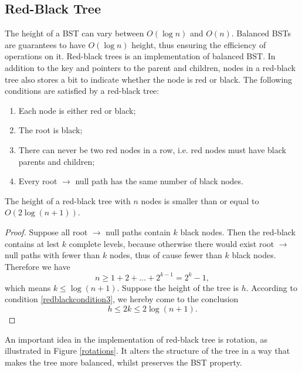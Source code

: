 \subsection{Red-Black Tree}
The height of a BST can vary between $O(\log n)$ and $O(n)$. Balanced BSTs are  guarantees to have $O(\log n)$ height, thus ensuring the efficiency of operations on it. Red-black trees is an implementation of balanced BST. In addition to the key and pointers to the parent and children, nodes in a red-black tree also stores a bit to indicate whether the node is red or black. The following conditions are satisfied by a red-black tree:
\begin{enumerate}
\item Each node is either red or black;
\item The root is black;\label{redblackcondition2}
\item There can never be two red nodes in a row, i.e. red nodes must have black parents and children;\label{redblackcondition3}
\item Every root $\rightarrow$ null path has the same number of black nodes.\label{redblackcondition4}
\end{enumerate}
\begin{theorem}
The height of a red-black tree with $n$ nodes is smaller than or equal to $O(2\log(n+1))$.
\end{theorem}
\begin{proof}
Suppose all root $\rightarrow$ null paths contain $k$ black nodes. Then the red-black contains at lest $k$ complete levels, because otherwise there would exist root $\rightarrow$ null paths with fewer than $k$ nodes, thus of cause fewer than $k$ black nodes. Therefore we have 
$$n\geq 1 + 2 + \dots + 2^{k-1} = 2^k-1,$$
which means $k\leq\log(n+1).$ Suppose the height of the tree is $h$. According to condition \ref{redblackcondition3}, we hereby come to the conclusion 
$$h\leq 2k\leq 2\log(n+1).$$
\end{proof}
An important idea in the implementation of red-black tree is rotation, as illustrated in Figure \ref{rotations}. It alters the structure of the tree in a way that makes the tree more balanced, whilst preserves the BST property.

